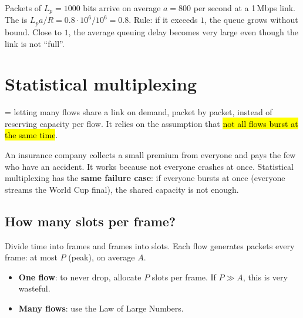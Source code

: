 \begin{example}
Packets of $L_p=1000$ bits arrive on average $a=800$ per second at a 1\,Mbps link. The  is $L_pa/R = 0.8\cdot10^6/10^6 = 0.8$.
Rule: if it exceeds $1$, the queue grows without bound. Close to $1$, the average queuing delay becomes very large even though the link is not ``full''.
\end{example}

\section{Statistical multiplexing}\label{sec:statmux}



\begin{defn}
 = letting many flows share a link on demand, packet by packet, instead of reserving capacity per flow. It relies
on the assumption that \hl{not all flows burst at the same time}.
\end{defn}

\begin{intuition}
An insurance company collects a small premium from everyone and pays the few who have an accident. It works because not everyone crashes at once.
Statistical multiplexing has the \textbf{same failure case}: if everyone bursts at once (everyone streams the World Cup final), the shared capacity is not enough.
\end{intuition}

\subsection{How many slots per frame?}

Divide time into frames and frames into slots. Each flow generates packets every frame: at most $P$ (peak), on average $A$.
\begin{itemize}
  \item \textbf{One flow}: to never drop, allocate $P$ slots per frame. If $P\gg A$, this is very wasteful.
  \item \textbf{Many flows}: use the Law of Large Numbers.
\end{itemize}


